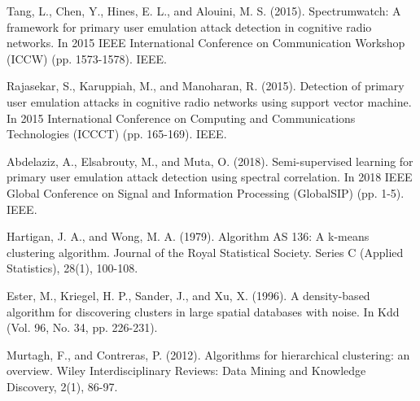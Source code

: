 \begin{thebibliography}{99}
 Tang, L., Chen, Y., Hines, E. L., and Alouini, M. S. (2015). Spectrumwatch: A framework for primary user emulation attack detection in cognitive radio networks. In 2015 IEEE International Conference on Communication Workshop (ICCW) (pp. 1573-1578). IEEE.

 Rajasekar, S., Karuppiah, M., and Manoharan, R. (2015). Detection of primary user emulation attacks in cognitive radio networks using support vector machine. In 2015 International Conference on Computing and Communications Technologies (ICCCT) (pp. 165-169). IEEE.

 Abdelaziz, A., Elsabrouty, M., and Muta, O. (2018). Semi-supervised learning for primary user emulation attack detection using spectral correlation. In 2018 IEEE Global Conference on Signal and Information Processing (GlobalSIP) (pp. 1-5). IEEE.

 Hartigan, J. A., and Wong, M. A. (1979). Algorithm AS 136: A k-means clustering algorithm. Journal of the Royal Statistical Society. Series C (Applied Statistics), 28(1), 100-108.

 Ester, M., Kriegel, H. P., Sander, J., and Xu, X. (1996). A density-based algorithm for discovering clusters in large spatial databases with noise. In Kdd (Vol. 96, No. 34, pp. 226-231).

 Murtagh, F., and Contreras, P. (2012). Algorithms for hierarchical clustering: an overview. Wiley Interdisciplinary Reviews: Data Mining and Knowledge Discovery, 2(1), 86-97.
\end{thebibliography}
